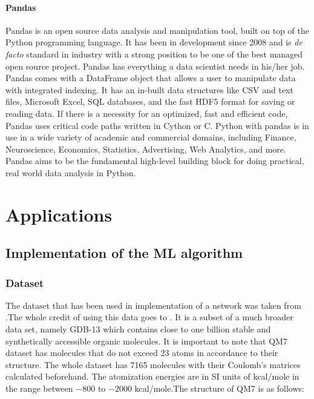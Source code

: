 \documentclass[a4paper,oneside,openright,11pt]{book}
\begin{document}
\subsection{Pandas}

Pandas \cite{pandas} is an open source data analysis and manipulation tool, built on top of the Python programming language. It has been in development since 2008 and is \emph{de facto} standard in industry with a strong position to be one of the best managed open source project. Pandas has everything a data scientist needs in his/her job. Pandas comes with a DataFrame object that allows a user to manipulate data with integrated indexing. It has an in-built data structures like CSV and text files, Microsoft Excel, SQL databases, and the fast HDF5 format for saving or reading data. If there is a necessity for an optimized, fast and efficient code, Pandas uses critical code paths written in Cython or C. Python with pandas is in use in a wide variety of academic and commercial domains, including Finance, Neuroscience, Economics, Statistics, Advertising, Web Analytics, and more. Pandas aims to be the fundamental high-level building block for doing practical, real world data analysis in Python.




\part{Applications}

\chapter{Implementation of the ML algorithm}

\section{Dataset}

The dataset that has been used in implementation of a network was taken from \cite{dataset}.The whole credit of using this data goes to \cite{blum} \cite{rupp}. It is a subset of a much broader data set, namely GDB-13 which contains close to one billion stable and synthetically accessible organic molecules. It is important to note that QM7 dataset has molecules that do not exceed 23 atoms in accordance to their structure. The whole dataset has 7165 molecules with their Coulomb's matrices calculated beforehand. The atomization energies are in SI units of kcal/mole in the range between $-800$ to $-2000$ kcal/mole.The structure of QM7 is as follows:
\end{document}
